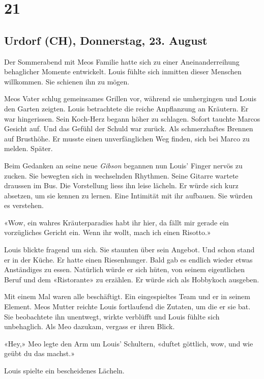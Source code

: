 \chapter{21}

\section{Urdorf (CH), Donnerstag, 23. 
August}



Der Sommerabend mit Meos Familie hatte sich zu einer Aneinanderreihung
behaglicher Momente entwickelt. Louis fühlte sich inmitten dieser
Menschen willkommen. Sie schienen ihn zu mögen. 

Meos Vater schlug gemeinsames Grillen vor, während sie umhergingen und
Louis den Garten zeigten. Louis betrachtete die reiche Anpflanzung an
Kräutern. Er war hingerissen. Sein Koch-Herz begann höher zu schlagen.
Sofort tauchte Marcos Gesicht auf. Und das Gefühl der Schuld war zurück.
Als schmerzhaftes Brennen auf Brusthöhe. Er musste einen unverfänglichen
Weg finden, sich bei Marco zu melden. Später.

Beim Gedanken an seine neue \emph{Gibson} begannen nun Louis’ Finger
nervös zu zucken. Sie bewegten sich in wechselnden Rhythmen. Seine
Gitarre wartete draussen im Bus. Die Vorstellung liess ihn leise
lächeln. Er würde sich kurz absetzen, um sie kennen zu lernen. Eine Intimität mit ihr aufbauen. Sie würden es verstehen.

«Wow, ein wahres Kräuterparadies habt  ihr hier, da fällt mir gerade ein vorzügliches Gericht ein. Wenn
ihr wollt, mach ich einen Risotto.»

Louis blickte fragend um sich. Sie staunten über sein Angebot.
Und schon stand er in der Küche. Er hatte einen Riesenhunger. Bald gab es endlich wieder etwas Anständiges
zu essen. Natürlich würde er sich hüten, von seinem eigentlichen Beruf und dem
«Ristorante» zu erzählen. Er würde sich als Hobbykoch ausgeben.

Mit einem Mal waren alle beschäftigt. Ein eingespieltes Team und er in
seinem Element. Meos Mutter reichte Louis fortlaufend die Zutaten, um die er sie bat.
Sie beobachtete ihn unentwegt, wirkte verblüfft und Louis fühlte sich
unbehaglich. Als Meo dazukam, vergass er ihren Blick.

«Hey,» Meo legte den Arm um Louis’ Schultern, «duftet göttlich, wow, und
wie geübt du das machst.»

Louis spielte ein bescheidenes Lächeln.

